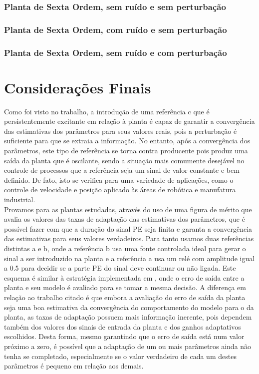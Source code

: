 \documentclass[
	12pt,				%
	openright,			%
	twoside,			%
	a4paper,			%
	english,			%
	french,				%
	spanish,			%
	brazil				%
	]{abntex2}
\begin{document}
\subsection{Planta de Sexta Ordem, sem ruído e sem perturbação}
\subsection{Planta de Sexta Ordem, com ruído e sem perturbação}
\subsection{Planta de Sexta Ordem, sem ruído e com perturbação}

\chapter{Considerações Finais}

Como foi visto no trabalho, a introdução de uma referência c que é persistentemente excitante em relação à planta é capaz de garantir a convergência das estimativas dos parâmetros para seus valores reais, pois a perturbação é suficiente para que se extraia a informação. No entanto, após a convergência dos parâmetros, este tipo de referência se torna contra producente pois produz uma saída da planta que é oscilante, sendo a situação mais comumente desejável no controle de processos que a referência seja um sinal de valor constante e bem definido. De fato, isto se verifica para uma variedade de aplicações, como o controle de velocidade e posição aplicado às áreas de robótica e manufatura industrial.\\

Provamos para as plantas estudadas, através do uso de uma figura de mérito que avalia os valores das taxas de adaptação das estimativas dos parâmetros, que é possível fazer com que a duração do sinal PE seja finita e garanta a convergência das estimativas para seus valores verdadeiros. Para tanto usamos duas referências distintas a e b, onde a referência b usa uma fonte controlada ideal para gerar o sinal a ser introduzido na planta e a referência a usa um relé com amplitude igual a 0.5 para decidir se a parte PE do sinal deve continuar ou não ligada. Este esquema é similar à estratégia implementada em \cite{naval}, onde o erro de saída entre a planta e seu modelo é avaliado para se tomar a mesma decisão. A diferença em relação ao trabalho citado é que embora a avaliação do erro de saída da planta seja uma boa estimativa da convergência do comportamento do modelo para o da planta, as taxas de adaptação possuem mais informação inerente, pois dependem também dos valores dos sinais de entrada da planta e dos ganhos adaptativos escolhidos. Desta forma, mesmo garantindo que o erro de saída está num valor próximo a zero, é possível que a adaptação de um ou mais parâmetros ainda não tenha se completado, especialmente se o valor verdadeiro de cada um destes parâmetros é pequeno em relação aos demais.\\
\end{document}
